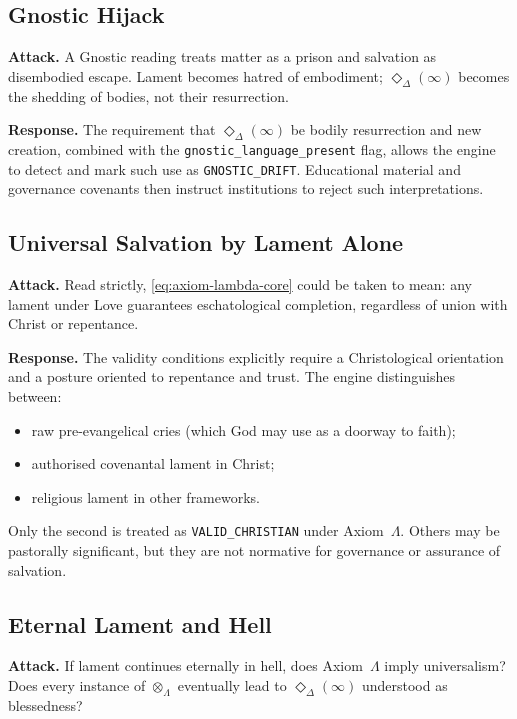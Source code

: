 \documentclass[11pt]{article}
\begin{document}
\subsection{Gnostic Hijack}

\textbf{Attack.} A Gnostic reading treats matter as a prison and salvation as disembodied escape. Lament becomes hatred of embodiment; $\Diamond_{\Delta}(\infty)$ becomes the shedding of bodies, not their resurrection.

\textbf{Response.} The requirement that $\Diamond_{\Delta}(\infty)$ be bodily resurrection and new creation, combined with the \texttt{gnostic\_language\_present} flag, allows the engine to detect and mark such use as \texttt{GNOSTIC\_DRIFT}. Educational material and governance covenants then instruct institutions to reject such interpretations.

\subsection{Universal Salvation by Lament Alone}

\textbf{Attack.} Read strictly, \eqref{eq:axiom-lambda-core} could be taken to mean: any lament under Love guarantees eschatological completion, regardless of union with Christ or repentance.

\textbf{Response.} The validity conditions explicitly require a Christological orientation and a posture oriented to repentance and trust. The engine distinguishes between:
\begin{itemize}
  \item raw pre-evangelical cries (which God may use as a doorway to faith);
  \item authorised covenantal lament in Christ;
  \item religious lament in other frameworks.
\end{itemize}
Only the second is treated as \texttt{VALID\_CHRISTIAN} under Axiom~$\Lambda$. Others may be pastorally significant, but they are not normative for governance or assurance of salvation.

\subsection{Eternal Lament and Hell}

\textbf{Attack.} If lament continues eternally in hell, does Axiom~$\Lambda$ imply universalism? Does every instance of $\otimes_{\Lambda}$ eventually lead to $\Diamond_{\Delta}(\infty)$ understood as blessedness?
\end{document}
